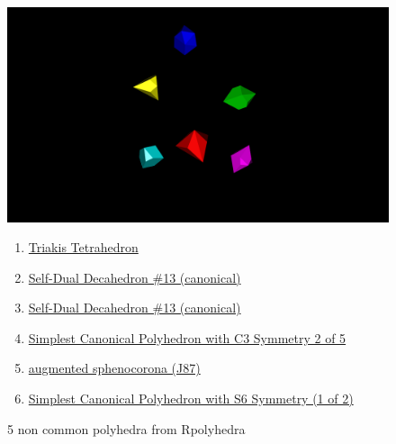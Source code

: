 \documentclass[a4paper,10pt]{article}
\begin{document}
\begin{figure}
 \begin{center}
    \includegraphics[width=15cm]{images/rpolyhedra_ic18_workshop.png}
 \end{center}
\caption{5 non common polyhedra from Rpolyhedra}
\begin{enumerate}
\item \href{https://qbotics.shinyapps.io/rpolyhedra-explorer/?%
}{Triakis Tetrahedron}

\item \href{https://qbotics.shinyapps.io/rpolyhedra-explorer/?_inputs_&polyhedron_color=%
}{Self-Dual Decahedron \#13 (canonical)}
\item \href{https://qbotics.shinyapps.io/rpolyhedra-explorer/?_inputs_&polyhedron_color=%
}{Self-Dual Decahedron \#13 (canonical)}

\item \href{
https://qbotics.shinyapps.io/rpolyhedra-explorer/?_inputs_&polyhedron_color=%
}{Simplest Canonical Polyhedron with C3 Symmetry 2 of 5}
\item \href{
https://qbotics.shinyapps.io/rpolyhedra-explorer/?_inputs_&polyhedron_color=%
\item \href{
https://qbotics.shinyapps.io/rpolyhedra-explorer/?_inputs_&polyhedron_color=%
}{Simplest Canonical Polyhedron with S6 Symmetry (1 of 2)}
\end{enumerate}
\end{figure}
\end{document}

